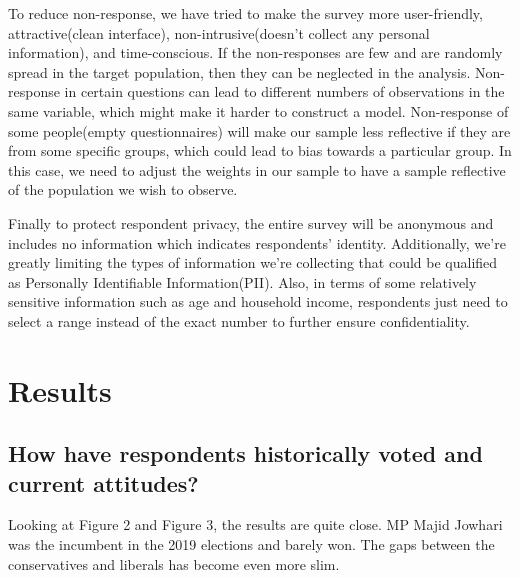 \documentclass[
]{article}
\begin{document}
To reduce non-response, we have tried to make the survey more
user-friendly, attractive(clean interface), non-intrusive(doesn't
collect any personal information), and time-conscious. If the
non-responses are few and are randomly spread in the target population,
then they can be neglected in the analysis. Non-response in certain
questions can lead to different numbers of observations in the same
variable, which might make it harder to construct a model. Non-response
of some people(empty questionnaires) will make our sample less
reflective if they are from some specific groups, which could lead to
bias towards a particular group. In this case, we need to adjust the
weights in our sample to have a sample reflective of the population we
wish to observe.

Finally to protect respondent privacy, the entire survey will be
anonymous and includes no information which indicates respondents'
identity. Additionally, we're greatly limiting the types of information
we're collecting that could be qualified as Personally Identifiable
Information(PII). Also, in terms of some relatively sensitive
information such as age and household income, respondents just need to
select a range instead of the exact number to further ensure
confidentiality.

\hypertarget{results}{%
\section{Results}\label{results}}

\hypertarget{how-have-respondents-historically-voted-and-current-attitudes}{%
\subsection{How have respondents historically voted and current
attitudes?}\label{how-have-respondents-historically-voted-and-current-attitudes}}

Looking at Figure 2 and Figure 3, the results are quite close. MP Majid
Jowhari was the incumbent in the 2019 elections and barely won. The gaps
between the conservatives and liberals has become even more slim.
\end{document}
